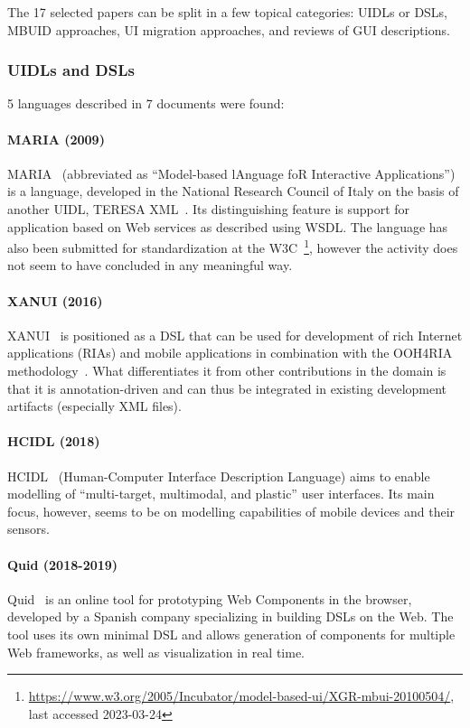 The 17 selected papers can be split in a few topical categories: UIDLs or DSLs, MBUID approaches, UI migration approaches, and reviews of GUI descriptions.

\subsubsection{UIDLs and DSLs}
5 languages described in 7 documents were found:

\paragraph{MARIA (2009)}
MARIA~\cite{Paterno2009, MariaPDF} (abbreviated as \enquote{Model-based lAnguage foR Interactive Applications}) is a language, developed in the National Research Council of Italy on the basis of another UIDL, TERESA XML~\cite{mori2004}.
Its distinguishing feature is support for application based on Web services as described using WSDL\@.
The language has also been submitted for standardization at the W3C~\footnote{\url{https://www.w3.org/2005/Incubator/model-based-ui/XGR-mbui-20100504/}, last accessed 2023-03-24}, however the activity does not seem to have concluded in any meaningful way.

\paragraph{XANUI (2016)}
XANUI~\cite{hermida2016xanui} is positioned as a DSL that can be used for development of rich Internet applications (RIAs) and mobile applications in combination with the OOH4RIA methodology~\cite{Meli2008}.
What differentiates it from other contributions in the domain is that it is annotation-driven and can thus be integrated in existing development artifacts (especially XML files).

\paragraph{HCIDL (2018)}
HCIDL~\cite{Gaouar2018} (Human-Computer Interface Description Language) aims to enable modelling of \enquote{multi-target, multimodal, and plastic} user interfaces.
Its main focus, however, seems to be on modelling capabilities of mobile devices and their sensors.

\paragraph{Quid (2018-2019)}
Quid~\cite{molina2018quid, Molina2019} is an online tool for prototyping Web Components in the browser, developed by a Spanish company specializing in building DSLs on the Web.
The tool uses its own minimal DSL and allows generation of components for multiple Web frameworks, as well as visualization in real time.

